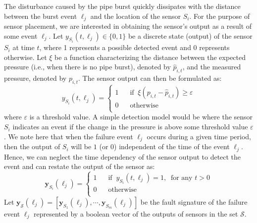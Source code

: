 \documentclass[twocolumn]{autart}
\begin{document}
The disturbance caused by the pipe burst quickly dissipates with the distance between the burst event $\ell_j$ and the location of the sensor $S_i$. 
For the purpose of sensor placement, we are interested in obtaining the sensor's output as a result of some event $\ell_j$. 
Let $y_{S_i}(t,\ell_j) \in \{0,1\} $ be a discrete state (output) of the sensor $S_i$ at time $t$, where 1 represents a possible detected event and 0 represents otherwise. 
Let $\xi$ be a function characterizing the distance between the expected pressure (i.e., when there is no pipe burst), denoted by $\hat{p}_{i,t}$, and the measured pressure, denoted by $p_{i,t}$. The sensor output can then be formulated as:\vspace{-0.15cm}
\begin{equation} \label{eq:3}
y_{S_i}(t,\ell_j) =
\left\{
\begin{array}{lcl}
1 & \;\;\;\text{if}\;\; \xi \left( p_{i,t} - \hat{p}_{i,t}\right) \geq \varepsilon  \\
0 & \;\;\;\text{otherwise}\\
\end{array}
\right.
\end{equation}
where $\varepsilon$ is a threshold value. A simple detection model would be where the sensor $S_i$ indicates an event if the change in the pressure is above some threshold value $\varepsilon $. We note here that when the failure event $\ell_j$ occurs during a given time period, then the output of $S_i$ will be $1$ (or $0$) independent of the time of the event $\ell_j$. 
Hence, we can neglect the time dependency of the sensor output to detect the event and can restate the output of the sensor as:\vspace{-0.25cm}
\begin{equation}
\mathbf{y}_{S_i}(\ell_j) = 
\left\{
\begin{array}{lcl}
 1 & \;\;\;\text{if}\;\;y_{S_i}(t,\ell_j) = 1,\;\;\text{for any }t>0 \\0 & \;\;\;\text{otherwise}\\
\end{array}
\right.
\end{equation}
Let $\mathbf{y}_{\mathcal{S}}(\ell_j) = \left[ \mathbf{y}_{S_1}(\ell_j), \cdots,  \mathbf{y}_{S_m}(\ell_j) \right]$ be the fault signature \cite{1335513} of the failure event $\ell_j$ represented by a boolean vector of the outputs of sensors in the set $\mathcal{S}$. \vspace{-0.25cm}
\end{document}
